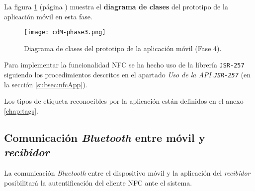La figura \ref{fig:cdM-phase3} (página \pageref{fig:cdM-phase3}) muestra el 
\textbf{diagrama de clases} del prototipo de la aplicación móvil en esta fase.

  \begin{figure}[H]
    \begin{center}
      \texttt{[image: cdM-phase3.png]}
      \caption{Diagrama de clases del prototipo de la aplicación móvil
      (Fase 4).}
      \label{fig:cdM-phase3}
    \end{center}
  \end{figure}

Para implementar la funcionalidad \acs{NFC} se ha hecho uso de la
librería \texttt{\acs{JSR}-257} siguiendo los procedimientos descritos en el 
apartado \emph{Uso de la \acs{API} \texttt{\acs{JSR}-257}} (en la sección
\ref{subsec:nfcApp}).

Los tipos de etiqueta reconocibles por la aplicación están definidos en el 
anexo \ref{chap:tags}.

\subsection{Comunicación \emph{Bluetooth} entre móvil y \emph{recibidor}}
\label{subsec:mobile-receiver}
La comunicación \emph{Bluetooth} entre el dispositivo móvil y la aplicación
del \emph{recibidor} posibilitará la autentificación del cliente \acs{NFC}
ante el sistema.

